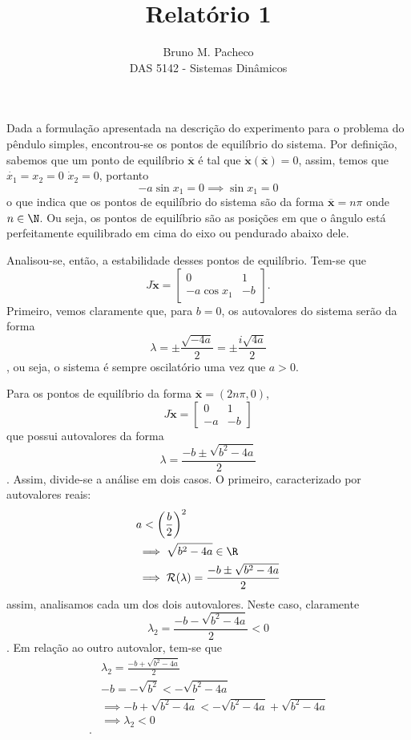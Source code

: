 \documentclass[a4paper]{report}
\begin{document}
 
\title{Relatório 1}
\author{Bruno M. Pacheco\\
DAS 5142 - Sistemas Dinâmicos}
 
\maketitle
 

Dada a formulação apresentada na descrição do experimento para o problema do pêndulo simples, encontrou-se os pontos de equilíbrio do sistema. Por definição, sabemos que um ponto de equilíbrio $\bm{\overline{x}}$ é tal que $\bm{\dot{x}}(\bm{\overline{x}}) = 0$, assim, temos que $\dot{x_1} = x_2 = 0$ $\dot{x}_2 = 0$, portanto \[
    -a \sin x_1 = 0 \implies \sin x_1 = 0
\] o que indica que os pontos de equilíbrio do sistema são da forma $\bm{\overline{x}} = n\pi$ onde $n\in \N$. Ou seja, os pontos de equilíbrio são as posições em que o ângulo está perfeitamente equilibrado em cima do eixo ou pendurado abaixo dele.

Analisou-se, então, a estabilidade desses pontos de equilíbrio. Tem-se que \[
    J\bm{\dot{x}} = \begin{bmatrix} 0 & 1 \\ -a\cos x_1 & -b \end{bmatrix} 
. \] Primeiro, vemos claramente que, para $b=0$, os autovalores do sistema serão da forma  \[
\lambda = \pm \frac{\sqrt{-4a}}{2} = \pm \frac{i \sqrt{4a} }{2}
\], ou seja, o sistema é sempre oscilatório uma vez que $a>0$.

Para os pontos de equilíbrio da forma $\bm{\overline{x}} = (2n\pi,0)$, \[
    J\bm{\dot{x}} = \begin{bmatrix} 0 & 1 \\ -a & -b \end{bmatrix} 
\] que possui autovalores da forma \[
\lambda = \frac{-b \pm \sqrt{b^2 -4a} }{2}
\]. Assim, divide-se a análise em dois casos. O primeiro, caracterizado por autovalores reais:
\begin{align*}
    &a < \left(\frac{b}{2}\right)^2 \\
    &\implies \sqrt{b^2 - 4a} \in \R \\
    &\implies \mathcal{R}(\lambda) = \frac{-b\pm\sqrt{b^2 - 4a} }{2}
\end{align*}
assim, analisamos cada um dos dois autovalores. Neste caso, claramente\[
    \lambda_2 = \frac{-b - \sqrt{b^2 -4a} }{2} < 0
\]. Em relação ao outro autovalor, tem-se que 
\begin{align*}
    &\lambda_2 = \frac{-b + \sqrt{b^2 -4a} }{2} \\
    &-b = -\sqrt{b^2} < -\sqrt{b^2-4a} \\
    &\implies -b + \sqrt{b^2 -4a} < -\sqrt{b^2-4a} + \sqrt{b^2-4a} \\
    &\implies \lambda_2 < 0 \\
.\end{align*}
\end{document}
